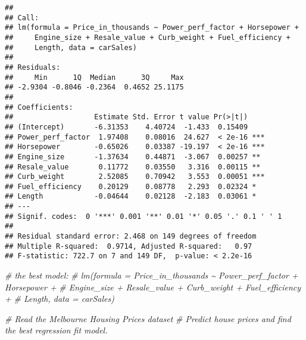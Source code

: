 \documentclass[
]{article}
\newenvironment{Shaded}{\begin{snugshade}}{\end{snugshade}}
\newcommand{\CommentTok}[1]{\textcolor[rgb]{0.56,0.35,0.01}{\textit{#1}}}
\begin{document}
\begin{verbatim}
## 
## Call:
## lm(formula = Price_in_thousands ~ Power_perf_factor + Horsepower + 
##     Engine_size + Resale_value + Curb_weight + Fuel_efficiency + 
##     Length, data = carSales)
## 
## Residuals:
##     Min      1Q  Median      3Q     Max 
## -2.9304 -0.8046 -0.2364  0.4652 25.1175 
## 
## Coefficients:
##                   Estimate Std. Error t value Pr(>|t|)    
## (Intercept)       -6.31353    4.40724  -1.433  0.15409    
## Power_perf_factor  1.97408    0.08016  24.627  < 2e-16 ***
## Horsepower        -0.65026    0.03387 -19.197  < 2e-16 ***
## Engine_size       -1.37634    0.44871  -3.067  0.00257 ** 
## Resale_value       0.11772    0.03550   3.316  0.00115 ** 
## Curb_weight        2.52085    0.70942   3.553  0.00051 ***
## Fuel_efficiency    0.20129    0.08778   2.293  0.02324 *  
## Length            -0.04644    0.02128  -2.183  0.03061 *  
## ---
## Signif. codes:  0 '***' 0.001 '**' 0.01 '*' 0.05 '.' 0.1 ' ' 1
## 
## Residual standard error: 2.468 on 149 degrees of freedom
## Multiple R-squared:  0.9714, Adjusted R-squared:   0.97 
## F-statistic: 722.7 on 7 and 149 DF,  p-value: < 2.2e-16
\end{verbatim}

\begin{Shaded}
\begin{Highlighting}[]
\CommentTok{\#\textquotesingle{} the best model: }
\CommentTok{\#\textquotesingle{} lm(formula = Price\_in\_thousands \textasciitilde{} Power\_perf\_factor + Horsepower + }
\CommentTok{\#\textquotesingle{} Engine\_size + Resale\_value + Curb\_weight + Fuel\_efficiency + }
\CommentTok{\#\textquotesingle{} Length, data = carSales)}
\end{Highlighting}
\end{Shaded}

\begin{Shaded}
\begin{Highlighting}[]
\CommentTok{\# Read the Melbourne Housing Prices dataset }
\CommentTok{\# Predict house prices and find the best regression fit model. }
\end{Highlighting}
\end{Shaded}
\end{document}
